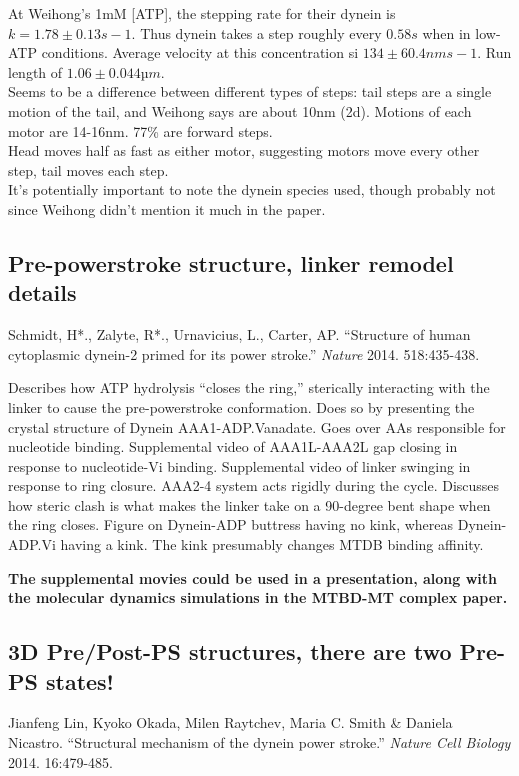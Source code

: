 \documentclass[10pt]{article} %
\begin{document}
At Weihong's 1mM [ATP], the stepping rate for their dynein is $k = 1.78 ± 0.13 s−1$. Thus dynein takes a step roughly every $0.58s$ when in low-ATP conditions. Average velocity at this concentration si $134 ± 60.4 nm s−1$. Run length of $1.06 ± 0.044 µm$.\\

Seems to be a difference between different types of steps: tail steps are a single motion of the tail, and Weihong says are about 10nm (2d). Motions of each motor are 14-16nm. 77\% are forward steps.\\

Head moves half as fast as either motor, suggesting motors move every other step, tail moves each step.\\

It's potentially important to note the dynein species used, though probably not since Weihong didn't mention it much in the paper.\\

\subsection{Pre-powerstroke structure, linker remodel details}
Schmidt, H*., Zalyte, R*., Urnavicius, L., Carter, AP. ``Structure of human cytoplasmic dynein-2 primed for its power stroke.'' \textit{Nature} 2014. 518:435-438.

Describes how ATP hydrolysis ``closes the ring,'' sterically interacting with the linker to cause the pre-powerstroke conformation. Does so by presenting the crystal structure of Dynein AAA1-ADP.Vanadate. Goes over AAs responsible for nucleotide binding. Supplemental video of AAA1L-AAA2L gap closing in response to nucleotide-Vi binding. Supplemental video of linker swinging in response to ring closure. AAA2-4 system acts rigidly during the cycle. Discusses how steric clash is what makes the linker take on a 90-degree bent shape when the ring closes. Figure on Dynein-ADP buttress having no kink, whereas Dynein-ADP.Vi having a kink. The kink presumably changes MTDB binding affinity.

\textbf{The supplemental movies could be used in a presentation, along with the molecular dynamics simulations in the MTBD-MT complex paper.}

\subsection{3D Pre/Post-PS structures, there are two Pre-PS states!}
Jianfeng Lin, Kyoko Okada, Milen Raytchev, Maria C. Smith \& Daniela Nicastro. ``Structural mechanism of the dynein power stroke.'' \textit{Nature Cell Biology} 2014. 16:479-485.
\end{document}
